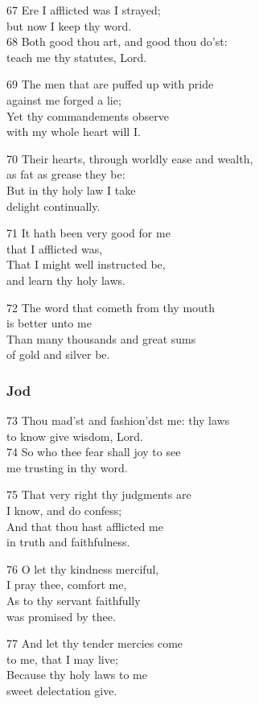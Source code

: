 \begin{multicols}{3}
67 Ere I afflicted was I strayed;\\
but now I keep thy word.\\
68 Both good thou art, and good thou do’st:\\
teach me thy statutes, Lord.

69 The men that are puffed up with pride\\
against me forged a lie;\\
Yet thy commandements observe\\
with my whole heart will I.

70 Their hearts, through worldly ease and wealth,\\
as fat as grease they be:\\
But in thy holy law I take\\
delight continually.

71 It hath been very good for me\\
that I afflicted was,\\
That I might well instructed be,\\
and learn thy holy laws.

72 The word that cometh from thy mouth\\
is better unto me\\
Than many thousands and great sums\\
of gold and silver be.

\subsubsection*{Jod}

73 Thou mad’st and fashion’dst me: thy laws\\
to know give wisdom, Lord.\\
74 So who thee fear shall joy to see\\
me trusting in thy word.

75 That very right thy judgments are\\
I know, and do confess;\\
And that thou hast afflicted me\\
in truth and faithfulness.

76 O let thy kindness merciful,\\
I pray thee, comfort me,\\
As to thy servant faithfully\\
was promised by thee.

77 And let thy tender mercies come\\
to me, that I may live;\\
Because thy holy laws to me\\
sweet delectation give.


\end{multicols}
